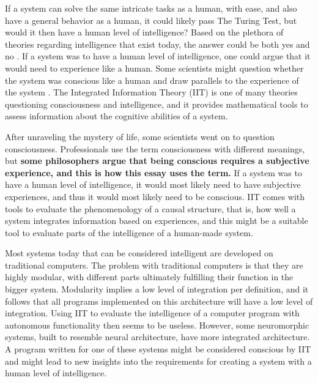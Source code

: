 If a system can solve the same intricate tasks as a human, with ease, and also have a general behavior as a human,
it could likely pass The Turing Test, but would it then have a human level of intelligence?
Based on the plethora of theories regarding intelligence that exist today, the answer could be both yes and no \cite{haenlein_brief_2019}.
If a system was to have a human level of intelligence, one could argue that it would need to experience like a human.
Some scientists might question whether the system was conscious like a human and draw parallels to the experience of the system \cite{tononi_integrated_2016}.
The Integrated Information Theory (IIT) is one of many theories questioning consciousness and intelligence, and it provides mathematical tools
to assess information about the cognitive abilities of a system.

After unraveling the mystery of life, some scientists went on to question consciousness.
Professionals use the term consciousness with different meanings, but \textbf{some philosophers argue that being conscious requires a subjective experience, and this is how this essay uses the term.}
If a system was to have a human level of intelligence, it would most likely need to have subjective experiences, and thus it would most likely need to be conscious.
IIT comes with tools to evaluate the phenomenology of a causal structure, that is,
how well a system integrates information based on experiences, and this might be a suitable tool to evaluate parts of the intelligence of a human-made system.

Most systems today that can be considered intelligent are developed on traditional computers. The problem with traditional computers is that they are highly modular, with different parts ultimately fulfilling their function in the bigger system. Modularity implies a low level of integration per definition, and it follows that all programs implemented on this architecture will have a low level of integration.
Using IIT to evaluate the intelligence of a computer program with autonomous functionality then seems to be useless.
However, some neuromorphic systems, built to resemble neural architecture, have more integrated architecture.
A program written for one of these systems might be considered conscious by IIT and might lead to new insights into the requirements for creating a system with a human level of intelligence.


